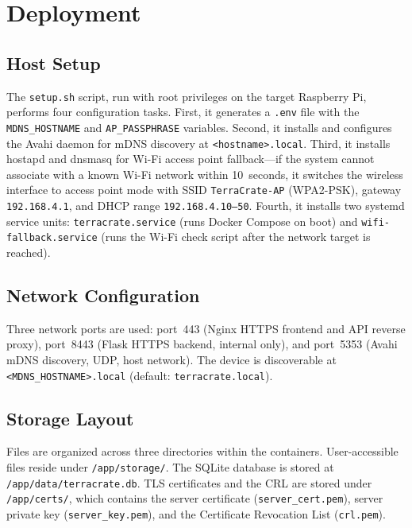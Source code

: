 \documentclass[12pt,letterpaper]{report}
\begin{document}
\section{Deployment}

\subsection{Host Setup}

The \texttt{setup.sh} script, run with root privileges on the target Raspberry Pi, performs four configuration tasks. First, it generates a \texttt{.env} file with the \texttt{MDNS\_HOSTNAME} and \texttt{AP\_PASSPHRASE} variables. Second, it installs and configures the Avahi daemon for mDNS discovery at \texttt{<hostname>.local}. Third, it installs hostapd and dnsmasq for Wi-Fi access point fallback---if the system cannot associate with a known Wi-Fi network within 10~seconds, it switches the wireless interface to access point mode with SSID \texttt{TerraCrate-AP} (WPA2-PSK), gateway \texttt{192.168.4.1}, and DHCP range \texttt{192.168.4.10--50}. Fourth, it installs two systemd service units: \texttt{terracrate.service} (runs Docker Compose on boot) and \texttt{wifi-fallback.service} (runs the Wi-Fi check script after the network target is reached).

\subsection{Network Configuration}

Three network ports are used: port~443 (Nginx HTTPS frontend and API reverse proxy), port~8443 (Flask HTTPS backend, internal only), and port~5353 (Avahi mDNS discovery, UDP, host network). The device is discoverable at \texttt{<MDNS\_HOSTNAME>.local} (default: \texttt{terracrate.local}).

\subsection{Storage Layout}

Files are organized across three directories within the containers. User-accessible files reside under \texttt{/app/storage/}. The SQLite database is stored at \texttt{/app/data/terracrate.db}. TLS certificates and the CRL are stored under \texttt{/app/certs/}, which contains the server certificate (\texttt{server\_cert.pem}), server private key (\texttt{server\_key.pem}), and the Certificate Revocation List (\texttt{crl.pem}).
\end{document}

